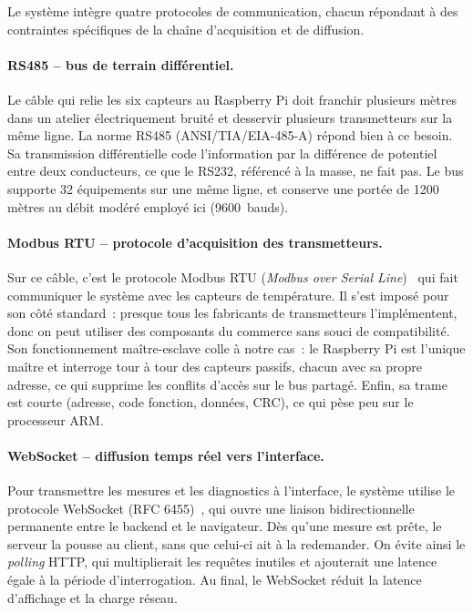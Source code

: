 Le système intègre quatre protocoles de communication, chacun répondant à des contraintes spécifiques de la chaîne d'acquisition et de diffusion.

\paragraph{RS485 -- bus de terrain différentiel.}
Le câble qui relie les six capteurs au Raspberry Pi doit franchir plusieurs mètres dans un atelier électriquement bruité et desservir plusieurs transmetteurs sur la même ligne. La norme RS485 (ANSI/TIA/EIA-485-A) répond bien à ce besoin. Sa transmission différentielle code l'information par la différence de potentiel entre deux conducteurs, ce que le RS232, référencé à la masse, ne fait pas. Le bus supporte 32 équipements sur une même ligne, et conserve une portée de 1200 mètres au débit modéré employé ici (9600~bauds).

\paragraph{Modbus RTU -- protocole d'acquisition des transmetteurs.}
Sur ce câble, c'est le protocole Modbus RTU (\emph{Modbus over Serial Line})~\cite{bib30} qui fait communiquer le système avec les capteurs de température. Il s'est imposé pour son côté standard~: presque tous les fabricants de transmetteurs l'implémentent, donc on peut utiliser des composants du commerce sans souci de compatibilité. Son fonctionnement maître-esclave colle à notre cas~: le Raspberry Pi est l'unique maître et interroge tour à tour des capteurs passifs, chacun avec sa propre adresse, ce qui supprime les conflits d'accès sur le bus partagé. Enfin, sa trame est courte (adresse, code fonction, données, CRC), ce qui pèse peu sur le processeur ARM.

\paragraph{WebSocket -- diffusion temps réel vers l'interface.}
Pour transmettre les mesures et les diagnostics à l'interface, le système utilise le protocole WebSocket (RFC 6455)~\cite{bib35}, qui ouvre une liaison bidirectionnelle permanente entre le backend et le navigateur. Dès qu'une mesure est prête, le serveur la pousse au client, sans que celui-ci ait à la redemander. On évite ainsi le \emph{polling} HTTP, qui multiplierait les requêtes inutiles et ajouterait une latence égale à la période d'interrogation. Au final, le WebSocket réduit la latence d'affichage et la charge réseau.

